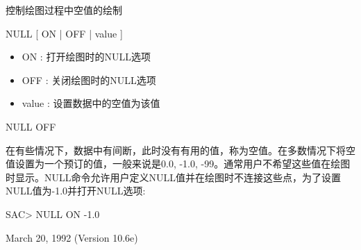 \label{cmd:null}

控制绘图过程中空值的绘制

NULL [ ON | OFF | value ]

\begin{itemize}
\item ON :  打开绘图时的NULL选项 
\item OFF : 关闭绘图时的NULL选项 
\item value : 设置数据中的空值为该值 
\end{itemize}

NULL OFF

在有些情况下，数据中有间断，此时没有有用的值，称为空值。在多数情况下将空值设置为一个预订的值，一般来说是0.0, -1.0, -99。通常用户不希望这些值在绘图时显示。NULL命令允许用户定义NULL值并在绘图时不连接这些点，为了设置NULL值为-1.0并打开NULL选项:
\begin{SACCode}
SAC> NULL ON -1.0
\end{SACCode}

March 20, 1992 (Version 10.6e)
